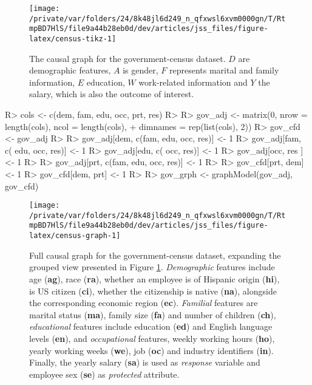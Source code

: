 \documentclass[
  nojss]{jss}
\begin{document}
\begin{CodeChunk}
\begin{figure}

{\centering \texttt{[image: /private/var/folders/24/8k48jl6d249\_n\_qfxwsl6xvm0000gn/T/RtmpBD7HlS/file9a44b28eb0d/dev/articles/jss\_files/figure-latex/census-tikz-1]} 

}

\caption[The causal graph for the government-census dataset]{The causal graph for the government-census dataset. $D$ are demographic features, $A$ is gender, $F$ represents marital and family information, $E$ education, $W$ work-related information and $Y$ the salary, which is also the outcome of interest.}\label{fig:census-tikz}
\end{figure}
\end{CodeChunk}

\begin{CodeChunk}
\begin{CodeInput}
R> cols <- c(dem, fam, edu, occ, prt, res)
R> 
R> gov_adj <- matrix(0, nrow = length(cols), ncol = length(cols),
+                   dimnames = rep(list(cols), 2))
R> gov_cfd <- gov_adj
R> 
R> gov_adj[dem, c(fam, edu, occ, res)] <- 1
R> gov_adj[fam, c(     edu, occ, res)] <- 1
R> gov_adj[edu, c(          occ, res)] <- 1
R> gov_adj[occ,                  res ] <- 1
R> 
R> gov_adj[prt, c(fam, edu, occ, res)] <- 1
R> 
R> gov_cfd[prt, dem] <- 1
R> gov_cfd[dem, prt] <- 1
R> 
R> gov_grph <- graphModel(gov_adj, gov_cfd)
\end{CodeInput}
\end{CodeChunk}

\begin{CodeChunk}
\begin{figure}

{\centering \texttt{[image: /private/var/folders/24/8k48jl6d249\_n\_qfxwsl6xvm0000gn/T/RtmpBD7HlS/file9a44b28eb0d/dev/articles/jss\_files/figure-latex/census-graph-1]} 

}

\caption{Full causal graph for the government-census dataset, expanding the grouped view presented in Figure \ref{fig:census-tikz}. \textit{Demographic} features include age (\textbf{ag}), race (\textbf{ra}), whether an employee is of Hispanic origin (\textbf{hi}), is US citizen (\textbf{ci}), whether the citizenship is native (\textbf{na}), alongside the corresponding economic region (\textbf{ec}). \textit{Familial} features are marital status (\textbf{ma}), family size (\textbf{fa}) and number of children (\textbf{ch}), \textit{educational} features include education (\textbf{ed}) and English language levels (\textbf{en}), and \textit{occupational} features, weekly working hours (\textbf{ho}), yearly working weeks (\textbf{we}), job (\textbf{oc}) and industry identifiers (\textbf{in}). Finally, the yearly salary (\textbf{sa}) is used as \textit{response} variable and employee sex (\textbf{se}) as \textit{protected} attribute.}\label{fig:census-graph}
\end{figure}
\end{CodeChunk}
\end{document}
